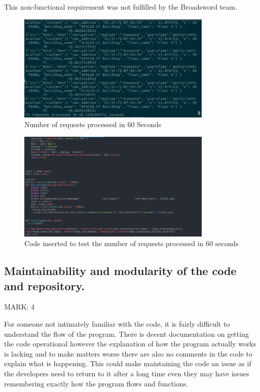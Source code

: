 \documentclass{article}
\begin{document}
\begin{flushleft}
This non-functional requirement was not fulfilled by the Broadsword team.
\end{flushleft}

\begin{figure}[ht]
  \includegraphics[width=350px]{Images/Aruba_Returns.png}
  \caption{Number of requests processed in 60 Seconds}
  \label{Number of Requests}
\end{figure}
\newpage
\begin{figure}[ht]
  \includegraphics[width=350px]{Images/timer.png}
  \caption{Code inserted to test the number of requests processed in 60 seconds}
  \label{Testing Code}

\end{figure}

\newpage
\subsection{Maintainability and modularity of the code and repository.}

\begin{flushleft}
MARK: 4
\end{flushleft}

\begin{flushleft}
For someone not intimately familiar with the code, it is fairly difficult to understand the flow of the program. There is decent documentation on getting the code operational however the explanation of how the program actually works is lacking and to make matters worse there are also no comments in the code to explain what is happening. This could make maintaining the code an issue as if the developers need to return to it after a long time even they may have issues remembering exactly how the program flows and functions.
\end{flushleft}
\end{document}
